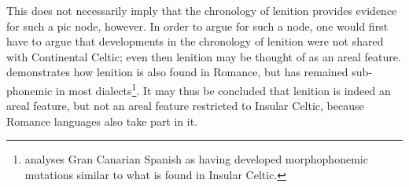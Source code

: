 This does not necessarily imply that the chronology of lenition provides evidence for such a \gls{pic} node, however. In order to argue for such a node, one would first have to argue that developments in the chronology of lenition were not shared with Continental Celtic; even then lenition may be thought of as an areal feature. \Textcite{martinet_celtic_1952} demonstrates how lenition is also found in \eg Romance, but has remained sub-phonemic in most dialects\footnote{\Textcite{Oft_Lenition85} analyses Gran Canarian Spanish as having developed morphophonemic mutations similar to what is found in Insular Celtic.}. It may thus be concluded that lenition is indeed an areal feature, but not an areal feature restricted to Insular Celtic, because Romance languages also take part in it.




